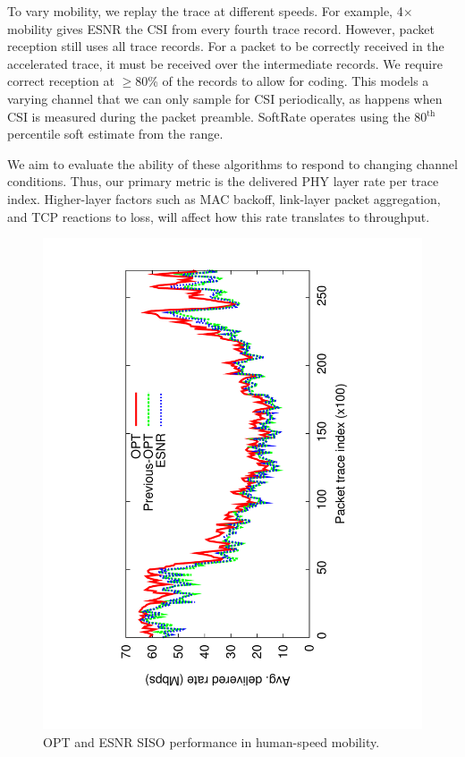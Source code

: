 To vary mobility, we replay the trace at different speeds. For example, 4$\times$ mobility gives ESNR the CSI from every fourth trace record. However, packet reception still uses all trace records. For a packet to be correctly received in the accelerated trace, it must be received over the intermediate records. We require correct reception at $\geq$80\% of the records to allow for coding. This models a varying channel that we can only sample for CSI periodically, as happens when CSI is measured during the packet preamble. SoftRate operates using the 80$^\text{th}$ percentile soft estimate from the range.

We aim to evaluate the ability of these algorithms to respond to changing channel conditions. Thus, our primary metric is the delivered PHY layer rate per trace index. Higher-layer factors such as MAC backoff, link-layer packet aggregation, and TCP reactions to loss, will affect how this rate translates to throughput.

\begin{figure}[t]
      \centering
      \includegraphics[angle=-90,viewport=120 68 491 760,clip,width=0.95\columnwidth]{figures/esnr/siso_rate_time_opt_eff.pdf}
      \caption{\label{fig:siso_rate_time_opt_eff} OPT and ESNR SISO performance in human-speed mobility.}
\end{figure}

